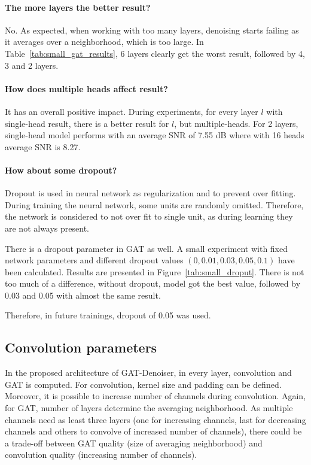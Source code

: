 \paragraph{The more layers the better result?}
No. As expected, when working with too many layers, denoising starts failing as it averages over a
neighborhood, which is too large. In Table~\ref{tab:small_gat_results}, 6 layers clearly get the worst result,
followed by 4, 3 and 2 layers.

\paragraph{How does multiple heads affect result?}
It has an overall positive impact. 
During experiments, for every layer $l$ with single-head result, there
is a better result for $l$, but multiple-heads. 
For 2 layers, single-head model performs with an average SNR of 7.55 dB where with 16 heads average SNR is 8.27.

\paragraph{How about some dropout?}

Dropout is used in neural network as regularization and to prevent over fitting. 
During training the neural network, some units are randomly omitted. Therefore, the network is 
considered to not over fit to single unit, as during learning they are not always present.

There is a dropout parameter in GAT as well. A small experiment with fixed network parameters
and different dropout values $(0, 0.01, 0.03, 0.05, 0.1)$ have been calculated. 
Results are presented in Figure~\ref{tab:small_droput}.
There is not too much of a difference, without dropout, model got the best value, followed by 
0.03 and 0.05 with almost the same result. 

Therefore, in future trainings, dropout of 0.05 was used.

\subsection{Convolution parameters}

In the proposed architecture of GAT-Denoiser, in every layer, convolution and GAT is computed. For convolution, kernel size and padding can be defined.
Moreover, it is possible to increase number of channels during convolution. 
Again, for GAT, number of layers determine the averaging neighborhood.
As multiple channels need as least three layers (one for increasing channels, last for decreasing channels and others to convolve of increased number of channels),
there could be a trade-off between GAT quality (size of averaging neighborhood) and convolution quality (increasing number of channels). 

